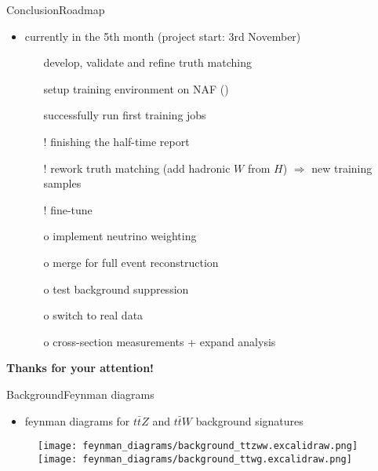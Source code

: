 \documentclass[9pt, aspectratio=169]{beamer}
\begin{document}
\begin{frame}{Conclusion}{Roadmap}
	\begin{itemize}
		\item currently in the 5th month (project start: 3rd November)
		\begin{itemize}
			\item[\ding{51}] develop, validate and refine truth matching
			\item[\ding{51}] setup training environment on NAF (\desy)
			\item[\ding{51}] successfully run first \spanet training jobs
			\item[!] finishing the half-time report
			\item[!] rework truth matching (add hadronic $W$ from $H$) $\Rightarrow$ new training samples 
			\item[!] fine-tune \spanet
			\item[o] implement neutrino weighting
			\item[o] merge for full event reconstruction
			\item[o] test background suppression
			\item[o] switch to real data
			\item[o] cross-section measurements + expand analysis
		\end{itemize}
	\end{itemize}

	\vspace{10mm}

	\begin{center}
    	\color{highlighter}\textbf{\LARGE Thanks for your attention!}
  	\end{center}
\end{frame}


\appendix

\begin{frame}{Background}{Feynman diagrams}
	\begin{itemize}
		\item feynman diagrams for $t\bar{t}Z$ and $t\bar{t}W$ background signatures
	\end{itemize}

	\begin{figure}
		\centering
		\texttt{[image: feynman\_diagrams/background\_ttzww.excalidraw.png]}\hspace{10mm}
		\texttt{[image: feynman\_diagrams/background\_ttwg.excalidraw.png]}
	\end{figure}
\end{frame}
\end{document}

